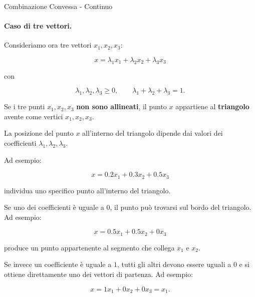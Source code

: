 \begin{definition}{Combinazione Convessa - Continuo}
\paragraph{Caso di tre vettori.}

Consideriamo ora tre vettori $x_1,x_2,x_3$:

$$
x=\lambda_1x_1+\lambda_2x_2+\lambda_3x_3
$$

con

$$
\lambda_1,\lambda_2,\lambda_3\geq0,
\qquad
\lambda_1+\lambda_2+\lambda_3=1.
$$

Se i tre punti $x_1,x_2,x_3$ \textbf{non sono allineati}, il punto $x$ appartiene al \textbf{triangolo} avente come vertici $x_1,x_2,x_3$.

\begin{center}
\end{center}

La posizione del punto $x$ all'interno del triangolo dipende dai valori dei coefficienti $\lambda_1,\lambda_2,\lambda_3$.

Ad esempio:

$$
x=0.2x_1+0.3x_2+0.5x_3
$$

individua uno specifico punto all'interno del triangolo.

Se uno dei coefficienti è uguale a $0$, il punto può trovarsi sul bordo del triangolo. Ad esempio:

$$
x=0.5x_1+0.5x_2+0x_3
$$

produce un punto appartenente al segmento che collega $x_1$ e $x_2$.

Se invece un coefficiente è uguale a $1$, tutti gli altri devono essere uguali a $0$ e si ottiene direttamente uno dei vettori di partenza. Ad esempio:

$$
x=1x_1+0x_2+0x_3=x_1.
$$


\end{definition}
